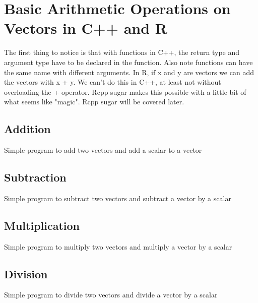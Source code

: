 \chapter{Basic Arithmetic Operations on Vectors in C++ and R}
The first thing to notice is that with functions in C++, the return type and argument type have to be declared in the function. Also note functions can have the same name with different arguments. In R, if x and y are vectors we can add the vectors with x + y. We can't do this in C++, at least not without overloading the + operator. Rcpp sugar makes this possible with a little bit of what seems like "magic". Rcpp sugar will be covered later.

\section{Addition}
Simple program to add two vectors and add a scalar to a vector

\lstset{language=C++}


\section{Subtraction}
Simple program to subtract two vectors and subtract a vector by a scalar

\lstset{language=C++}


\section{Multiplication}
Simple program to multiply two vectors and multiply a vector by a scalar

\lstset{language=C++}


\section{Division}
Simple program to divide two vectors and divide a vector by a scalar

\lstset{language=C++}
